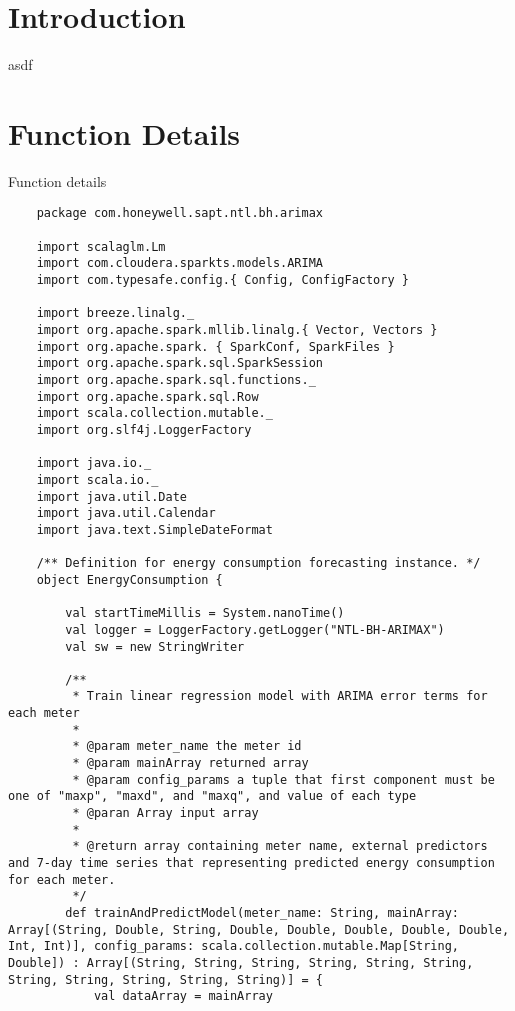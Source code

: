 \documentclass[12pt]{article}
\begin{document}
	\maketitle
	\section{Introduction}
	asdf
    \section{Function Details}
    Function details
	\begin{lstlisting}
	package com.honeywell.sapt.ntl.bh.arimax
    
    import scalaglm.Lm
    import com.cloudera.sparkts.models.ARIMA
    import com.typesafe.config.{ Config, ConfigFactory }
    
    import breeze.linalg._
    import org.apache.spark.mllib.linalg.{ Vector, Vectors }
    import org.apache.spark. { SparkConf, SparkFiles }
    import org.apache.spark.sql.SparkSession
    import org.apache.spark.sql.functions._
    import org.apache.spark.sql.Row
    import scala.collection.mutable._
    import org.slf4j.LoggerFactory
    
    import java.io._
    import scala.io._
    import java.util.Date
    import java.util.Calendar
    import java.text.SimpleDateFormat
    
    /** Definition for energy consumption forecasting instance. */
    object EnergyConsumption {
    
       	val startTimeMillis = System.nanoTime()
       	val logger = LoggerFactory.getLogger("NTL-BH-ARIMAX")
       	val sw = new StringWriter
    
       	/**
      	 * Train linear regression model with ARIMA error terms for each meter
      	 * 
      	 * @param meter_name the meter id
      	 * @param mainArray returned array 
      	 * @param config_params a tuple that first component must be one of "maxp", "maxd", and "maxq", and value of each type
      	 * @paran Array input array  
      	 * 
      	 * @return array containing meter name, external predictors and 7-day time series that representing predicted energy consumption for each meter.
      	 */
       	def trainAndPredictModel(meter_name: String, mainArray: Array[(String, Double, String, Double, Double, Double, Double, Double, Int, Int)], config_params: scala.collection.mutable.Map[String, Double]) : Array[(String, String, String, String, String, String, String, String, String, String, String)] = {
       		val dataArray = mainArray
    

\end{lstlisting}
\end{document}
